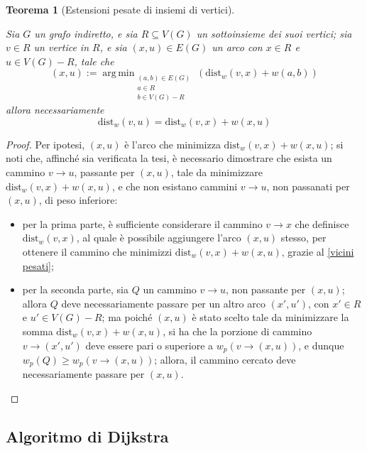 \documentclass[14pt]{extreport}
\DeclareMathOperator*{\argmin}{arg\,min}
\newtheorem{theorem}{Teorema}[subsection]
\theoremstyle{definition}
\theoremstyle{definition}
\begin{document}
\begin{theorem}[Estensioni pesate di insiemi di vertici]
    \label{dijkstra theorem}

    Sia $G$ un grafo indiretto, e sia $R \subseteq V(G)$ un sottoinsieme dei suoi vertici; sia $v\in R$ un vertice in $R$, e sia $(x, u) \in E(G)$ un arco con $x \in R$ e $u \in V(G) - R$, tale che $$(x, u):= \argmin_{\substack{(a, b) \in E(G) \\ a \in R \\ b \in V(G) - R}}{\left(\mathrm{dist}_w(v, x) + w(a, b)\right)}$$ allora necessariamente $$\mathrm{dist}_w(v, u) = \mathrm{dist}_w(v, x) + w(x, u)$$
\end{theorem}

\begin{proof}
    Per ipotesi, $(x, u)$ è l'arco che minimizza $\mathrm{dist}_w(v, x) + w(x, u)$; si noti che, affinché sia verificata la tesi, è necessario dimostrare che esista un cammino $v \rightarrow u$, passante per $(x, u)$, tale da minimizzare $\mathrm{dist}_w(v, x) + w(x, u)$, e che non esistano cammini $v \rightarrow u$, non passanati per $(x, u)$, di peso inferiore:

    \begin{itemize}
        \item per la prima parte, è sufficiente considerare il cammino $v \rightarrow x$ che definisce $\mathrm{dist}_w(v, x)$, al quale è possibile aggiungere l'arco $(x, u)$ stesso, per ottenere il cammino che minimizzi $\mathrm{dist}_w(v, x) + w(x, u)$, grazie al \cref{vicini pesati};
        \item per la seconda parte, sia $Q$ un cammino $v \rightarrow u$, non passante per $(x, u)$; allora $Q$ deve necessariamente passare per un altro arco $(x', u')$, con $x' \in R$ e $u' \in V(G) - R$; ma poiché $(x, u)$ è stato scelto tale da minimizzare la somma $\mathrm{dist}_w(v, x) + w(x, u)$, si ha che la porzione di cammino $v \rightarrow (x', u')$ deve essere pari o superiore a $w_p\left(v \rightarrow (x, u)\right)$, e dunque $w_p(Q) \ge w_p(v \rightarrow (x, u))$; allora, il cammino cercato deve necessariamente passare per $(x, u)$.
    \end{itemize}
\end{proof}

\subsection{Algoritmo di Dijkstra}
\end{document}
